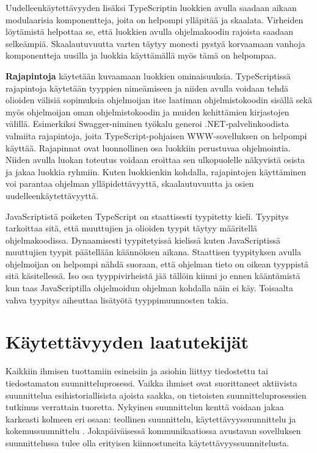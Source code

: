 \documentclass[utf8]{gradu3}
\begin{document}
Uudelleenkäytettävyyden lisäksi TypeScriptin luokkien avulla saadaan aikaan modulaarisia komponentteja, joita on helpompi ylläpitää ja skaalata. Virheiden löytämistä helpottaa se, että luokkien avulla ohjelmakoodin rajoista saadaan selkeämpiä. Skaalautuvuutta varten täytyy monesti pystyä korvaamaan vanhoja komponentteja uusilla ja luokkia käyttämällä myös tämä on helpompaa.

\textbf{Rajapintoja} käytetään kuvaamaan luokkien ominaisuuksia. TypeScriptissä rajapintoja käytetään tyyppien nimeämiseen ja niiden avulla voidaan tehdä olioiden välisiä sopimuksia ohjelmoijan itse laatiman ohjelmistokoodin sisällä sekä myös ohjelmoijan oman ohjelmistokoodin ja muiden kehittämien kirjastojen välillä. \parencite[]{typescript-interfaces} Esimerkiksi Swagger-niminen työkalu generoi .NET-palvelinkoodista valmiita rajapintoja, joita TypeScript-pohjaisen WWW-sovelluksen on helpompi käyttää. Rajapinnat ovat luonnollinen osa luokkiin perustuvaa ohjelmointia. Niiden avulla luokan toteutus voidaan eroittaa sen ulkopuolelle näkyvistä osista ja jakaa luokkia ryhmiin. Kuten luokkienkin kohdalla, rajapintojen käyttäminen voi parantaa ohjelman ylläpidettävyyttä, skaalautuvuutta ja osien uudelleenkäytettävyyttä.

JavaScriptistä poiketen TypeScript on staattisesti tyypitetty kieli. Tyypitys tarkoittaa sitä, että muuttujien ja olioiden tyypit täytyy määritellä ohjelmakoodissa. Dynaamisesti tyypitetyissä kielissä kuten JavaScriptissä muuttujien tyypit päätellään käännöksen aikana. Staattisen tyypityksen avulla ohjelmoijan on helpompi nähdä suoraan, että ohjelman tieto on oikean tyyppistä sitä käsitellessä. Iso osa tyyppivirheistä jää tällöin kiinni jo ennen kääntämistä kun taas JavaScriptilla ohjelmoidun ohjelman kohdalla näin ei käy. Toisaalta vahva tyypitys aiheuttaa lisätyötä tyyppimuunnosten takia.

\section{Käytettävyyden laatutekijät}

Kaikkiin ihmisen tuottamiin esineisiin ja asiohin liittyy tiedostettu tai tiedostamaton suunnitteluprosessi. Vaikka ihmiset ovat suorittaneet aktiivista suunnittelua esihistoriallisista ajoista saakka, on tietoisten suunnitteluprosessien tutkimus verrattain tuoretta. Nykyinen suunnittelun kenttä voidaan jakaa karkeasti kolmeen eri osaan: teollinen suunnittelu, käytettävyyssuunnittelu ja kokemussuunnittelu \parencite[]{norman-doet}. Jokapäiväisessä kommunikaatiossa avustavan sovelluksen suunnittelussa tulee olla erityisen kiinnostuneita käytettävyyssuunnitelusta.
\end{document}
